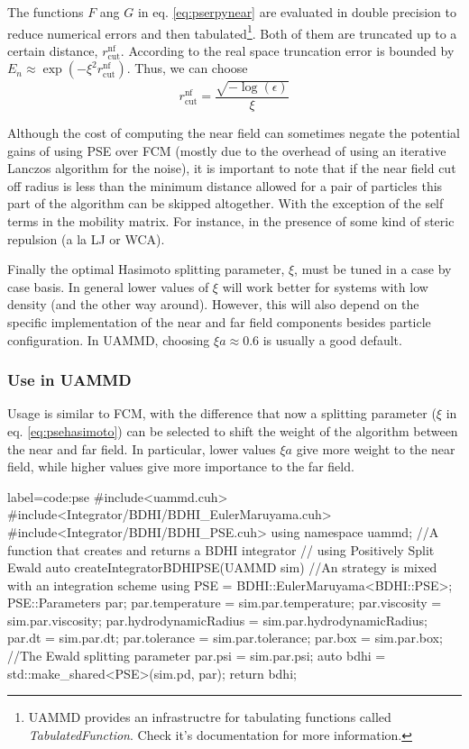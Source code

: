 \documentclass[ twoside,openright,titlepage,numbers=noenddot,%
headinclude,footinclude,cleardoublepage=empty,abstract=on,
BCOR=5mm,paper=a4,fontsize=11pt, dvipsnames
]{scrreprt}
\newcommand{\uammd}{\gls{UAMMD}\xspace}
\begin{document}
The functions $F$ ang $G$ in eq. \eqref{eq:pserpynear} are evaluated in double precision to reduce numerical errors and then tabulated\footnote{\uammd provides an infrastructre for tabulating functions called \emph{TabulatedFunction}. Check it's documentation for more information.}. Both of them are truncated up to a certain distance, $r_{\textrm{cut}}^{\textrm{nf}}$. According to \cite{Lindbo2011} the real space truncation error is bounded by $E_n\approx \exp(-\xi^2r_{\textrm{cut}}^{\textrm{nf}})$. Thus, we can choose
\begin{equation}
r_{\textrm{cut}}^{\textrm{nf}} = \frac{\sqrt{-\log(\epsilon)}}{\xi}
\end{equation}

Although the cost of computing the near field can sometimes negate the potential gains of using \gls{PSE} over \gls{FCM} (mostly due to the overhead of using an iterative Lanczos algorithm for the noise), it is important to note that if the near field cut off radius is less than the minimum distance allowed for a pair of particles this part of the algorithm can be skipped altogether. With the exception of the self terms in the mobility matrix. For instance, in the presence of some kind of steric repulsion (a la \gls{LJ} or WCA).

Finally the optimal Hasimoto splitting parameter, $\xi$, must be tuned in a case by case basis. In general lower values of $\xi$ will work better for systems with low density (and the other way around). However, this will also depend on the specific implementation of the near and far field components besides particle configuration. In \uammd, choosing $\xi a \approx 0.6$ is usually a good default.

\subsubsection*{Use in UAMMD}

Usage is similar to \gls{FCM}, with the difference that now a splitting parameter ($\xi$ in eq. \eqref{eq:psehasimoto}) can be selected to shift the weight of the algorithm between the near and far field. In particular, lower values $\xi a$ give more weight to the near field, while higher values give more importance to the far field.

\begin{code2}  {label=code:pse}
#include<uammd.cuh>
#include<Integrator/BDHI/BDHI_EulerMaruyama.cuh>
#include<Integrator/BDHI/BDHI_PSE.cuh>
using namespace uammd;
//A function that creates and returns a BDHI integrator
// using Positively Split Ewald
auto createIntegratorBDHIPSE(UAMMD sim){   
  //An strategy is mixed with an integration scheme
  using PSE = BDHI::EulerMaruyama<BDHI::PSE>;
  PSE::Parameters par;
  par.temperature = sim.par.temperature;
  par.viscosity = sim.par.viscosity;
  par.hydrodynamicRadius = sim.par.hydrodynamicRadius;
  par.dt = sim.par.dt;
  par.tolerance = sim.par.tolerance;
  par.box = sim.par.box;
  //The Ewald splitting parameter
  par.psi = sim.par.psi;
  auto bdhi = std::make_shared<PSE>(sim.pd, par);
  return bdhi;
}
\end{code2}
\end{document}
